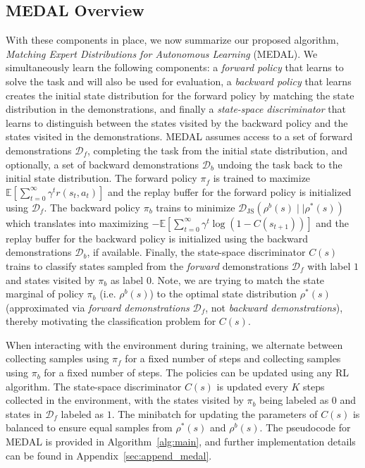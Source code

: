 \documentclass[nohyperref]{article}
\theoremstyle{plain}
\theoremstyle{definition}
\theoremstyle{remark}
\begin{document}
\subsection{MEDAL Overview}
\label{alg:summary}
With these components in place, we now summarize our proposed algorithm, \emph{Matching Expert Distributions for Autonomous Learning} (MEDAL). We simultaneously learn the following components: a \emph{forward policy} that learns to solve the task and will also be used for evaluation, a \textit{backward policy} that learns creates the initial state distribution for the forward policy by matching the state distribution in the demonstrations, and finally a \textit{state-space discriminator} that learns to distinguish between the states visited by the backward policy and the states visited in the demonstrations. MEDAL assumes access to a set of forward demonstrations $\mathcal{D}_f$, completing the task from the initial state distribution, and optionally, a set of backward demonstrations $\mathcal{D}_b$ undoing the task back to the initial state distribution. The forward policy $\pi_f$ is trained to maximize $\mathbb{E}[{\sum_{t=0}^\infty \gamma^t r(s_t, a_t)}]$ and the replay buffer for the forward policy is initialized using $\mathcal{D}_f$. The backward policy $\pi_b$ trains to minimize ${\mathcal{D}_{\textrm{JS}}(\rho^b(s) \mid\mid \rho^*(s))}$ which translates into maximizing ${-\mathbb{E}[\sum_{t=0}^\infty \gamma^t \log(1-C(s_{t+1}))]}$ and the replay buffer for the backward policy is initialized using the backward demonstrations $\mathcal{D}_b$, if available. Finally, the state-space discriminator $C(s)$ trains to classify states sampled from the \textit{forward} demonstrations $\mathcal{D}_f$ with label $1$ and states visited by $\pi_b$ as label $0$. Note, we are trying to match the state marginal of policy $\pi_b$ (i.e. $\rho^b(s)$) to the optimal state distribution $\rho^*(s)$ (approximated via \textit{forward demonstrations} $\mathcal{D}_f$, not \textit{backward demonstrations}), thereby motivating the classification problem for $C(s)$.

When interacting with the environment during training, we alternate between collecting samples using $\pi_f$ for a fixed number of steps and collecting samples using $\pi_b$ for a fixed number of steps. The policies can be updated using any RL algorithm. The state-space discriminator $C(s)$ is updated every $K$ steps collected in the environment, with the states visited by $\pi_b$ being labeled as $0$ and states in $\mathcal{D}_f$ labeled as $1$. The minibatch for updating the parameters of $C(s)$ is balanced to ensure equal samples from $\rho^*(s)$ and $\rho^b(s)$. The pseudocode for MEDAL is provided in Algorithm~\ref{alg:main}, and further implementation details can be found in Appendix~\ref{sec:append_medal}.
\end{document}
